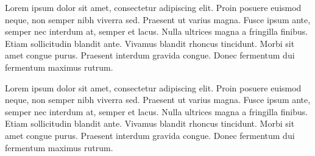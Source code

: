 Lorem ipsum dolor sit amet, consectetur adipiscing elit. Proin posuere euismod neque, non semper nibh viverra sed. Praesent ut varius magna. Fusce ipsum ante, semper nec interdum at, semper et lacus. Nulla ultrices magna a fringilla finibus. Etiam sollicitudin blandit ante. Vivamus blandit rhoncus tincidunt. Morbi sit amet congue purus. Praesent interdum gravida congue. Donec fermentum dui fermentum maximus rutrum.

Lorem ipsum dolor sit amet, consectetur adipiscing elit. Proin posuere euismod neque, non semper nibh viverra sed. Praesent ut varius magna. Fusce ipsum ante, semper nec interdum at, semper et lacus. Nulla ultrices magna a fringilla finibus. Etiam sollicitudin blandit ante. Vivamus blandit rhoncus tincidunt. Morbi sit amet congue purus. Praesent interdum gravida congue. Donec fermentum dui fermentum maximus rutrum.

